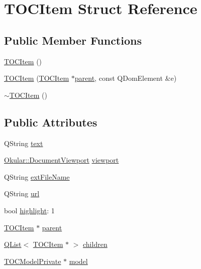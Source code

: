 \hypertarget{structTOCItem}{\section{T\+O\+C\+Item Struct Reference}
\label{structTOCItem}
}
\subsection*{Public Member Functions}
\begin{DoxyCompactItemize}
\item 
\hyperlink{structTOCItem_adbcebff713a8b95342584b67ec73c7e2}{T\+O\+C\+Item} ()
\item 
\hyperlink{structTOCItem_a06dbb65a2ee20d2f5f0ecc9c8080d5de}{T\+O\+C\+Item} (\hyperlink{structTOCItem}{T\+O\+C\+Item} $\ast$\hyperlink{structTOCItem_a690aa86297cce8bc277d28f8ccba1075}{parent}, const Q\+Dom\+Element \&e)
\item 
\hyperlink{structTOCItem_a6204a9ce1b5470c2919b28310aabb630}{$\sim$\+T\+O\+C\+Item} ()
\end{DoxyCompactItemize}
\subsection*{Public Attributes}
\begin{DoxyCompactItemize}
\item 
Q\+String \hyperlink{structTOCItem_a15c67ed9a7ac8a4992955a3e7249111c}{text}
\item 
\hyperlink{classOkular_1_1DocumentViewport}{Okular\+::\+Document\+Viewport} \hyperlink{structTOCItem_a4e72f01f6a8248cb770a35e16e33652a}{viewport}
\item 
Q\+String \hyperlink{structTOCItem_a35a5cc31947557c3acf0608688ed2346}{ext\+File\+Name}
\item 
Q\+String \hyperlink{structTOCItem_ad2cc1b82e1f4c163529fb6efcfc9c59a}{url}
\item 
bool \hyperlink{structTOCItem_a7e46da40ebe84b7c202695a181d7c52e}{highlight}\+: 1
\item 
\hyperlink{structTOCItem}{T\+O\+C\+Item} $\ast$ \hyperlink{structTOCItem_a690aa86297cce8bc277d28f8ccba1075}{parent}
\item 
\hyperlink{classQList}{Q\+List}$<$ \hyperlink{structTOCItem}{T\+O\+C\+Item} $\ast$ $>$ \hyperlink{structTOCItem_ae6af06a9560cf19b909c1417c9bef826}{children}
\item 
\hyperlink{classTOCModelPrivate}{T\+O\+C\+Model\+Private} $\ast$ \hyperlink{structTOCItem_affbfd5aed8656b2a5c11588b192e701e}{model}
\end{DoxyCompactItemize}


